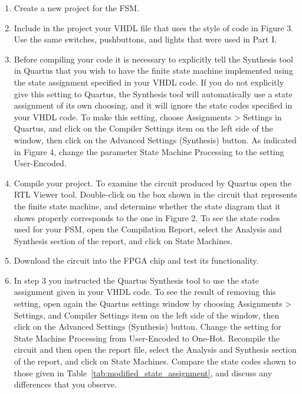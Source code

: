 \documentclass[epsfig,10pt,fullpage]{article}
\begin{document}
\begin{enumerate}
\item Create a new project for the FSM.

\item Include in the project your VHDL file that uses the style of code in Figure 3.
Use the same switches, pushbuttons, and lights that were used in Part I.

\item Before compiling your code it is necessary to explicitly tell the Synthesis tool in
Quartus that you wish to have the finite state machine implemented using the state
assignment specified in your VHDL code. If you do not explicitly give this
setting to Quartus, the Synthesis tool will automatically use a state assignment of
its own choosing, and it will ignore the state codes specified in your VHDL code. To
make this setting, choose {\sf Assignments > Settings} in Quartus, and click on the
{\sf Compiler Settings} item on the left side of the window, then click on 
the {\sf Advanced Settings (Synthesis)} button.  As indicated in Figure 4, change the 
parameter {\sf State Machine Processing} to the setting {\sf User-Encoded}.

\item Compile your project. To examine the circuit produced by Quartus open 
the RTL Viewer tool. Double-click
on the box shown in the circuit that represents the finite state machine, and determine
whether the state diagram that it shows properly corresponds to the one in Figure 2.
To see the state codes used for your FSM, open the Compilation Report, select the {\sf Analysis
and Synthesis} section of the report, and click on {\sf State Machines}.

\item Download the circuit into the FPGA chip and test its functionality.

\item In step 3 you instructed the Quartus Synthesis tool to use the state
assignment given in your VHDL code. To see the result of removing this setting, open
again the Quartus settings window by choosing {\sf Assignments > Settings}, and 
{\sf Compiler Settings} item on the left side of the window, then click on 
the {\sf Advanced Settings (Synthesis)} button. Change the setting for  
{\sf State Machine Processing} from {\sf User-Encoded} to {\sf One-Hot}. Recompile the
circuit and then open the report file, select the {\sf Analysis
and Synthesis} section of the report, and click on {\sf State Machines}.
Compare the state codes shown to those given in Table~\ref{tab:modified_state_assignment}, and
discuss any differences that you observe.
\end{enumerate}
\end{document}
